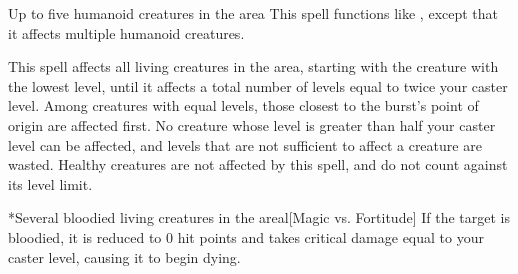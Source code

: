 \begin{spellheader}
\end{spellheader}
\begin{spelleffects}
    \begin{spelltargets}{Up to five humanoid creatures in the area}
        \spellsuccess This spell functions like , except that it affects multiple humanoid creatures.
    \end{spelltargets}
\end{spelleffects}
\begin{spellfooter}
    
\end{spellfooter}

\begin{spellheader}
\end{spellheader}
\begin{spelleffects}
    \spelleffect This spell affects all \bloodied living creatures in the area, starting with the creature with the lowest level, until it affects a total number of levels equal to twice your caster level. Among creatures with equal levels, those closest to the burst's point of origin are affected first. No creature whose level is greater than half your caster level can be affected, and levels that are not sufficient to affect a creature are wasted. Healthy creatures are not affected by this spell, and do not count against its level limit.
    \begin{spelltargets}*{Several bloodied living creatures in the area}l[Magic vs. Fortitude]
        \spellsuccess If the target is bloodied, it is reduced to 0 hit points and takes critical damage equal to your caster level, causing it to begin dying.
    \end{spelltargets}
\end{spelleffects}
\begin{spellfooter}
    
\end{spellfooter}

